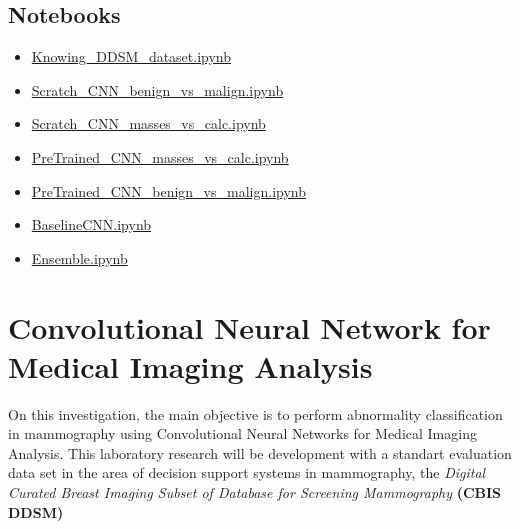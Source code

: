 \documentclass{book}
\begin{document}
        \section{Notebooks}
        \begin{itemize}
            \item \href{https://github.com/MarshaGomez/CNN-Medical-Imaging-Analysis/blob/main/Code/Knowing_DDSM_dataset.ipynb}{Knowing\_DDSM\_dataset.ipynb}
            \item \href{https://github.com/MarshaGomez/CNN-Medical-Imaging-Analysis/blob/main/Code/Scratch_CNN_benign_vs_malign.ipynb}{Scratch\_CNN\_benign\_vs\_malign.ipynb}
            \item \href{https://github.com/MarshaGomez/CNN-Medical-Imaging-Analysis/blob/main/Code/Scratch_CNN_masses_vs_calc.ipynb}{Scratch\_CNN\_masses\_vs\_calc.ipynb}
            \item \href{https://github.com/MarshaGomez/CNN-Medical-Imaging-Analysis/blob/main/Code/PreTrained_CNN_masses_vs_calc.ipynb}{PreTrained\_CNN\_masses\_vs\_calc.ipynb}
            \item \href{https://github.com/MarshaGomez/CNN-Medical-Imaging-Analysis/blob/main/Code/PreTrained_CNN_benign_vs_malign.ipynb}{PreTrained\_CNN\_benign\_vs\_malign.ipynb}
            \item \href{https://github.com/MarshaGomez/CNN-Medical-Imaging-Analysis/blob/main/Code/BaselineCNN.ipynb}{BaselineCNN.ipynb}
            \item \href{https://github.com/MarshaGomez/CNN-Medical-Imaging-Analysis/blob/main/Code/Ensemble.ipynb}{Ensemble.ipynb}
        \end{itemize}


    \chapter{Convolutional Neural Network for Medical Imaging Analysis}  %

    On this investigation, the main objective is to perform abnormality classification in mammography using Convolutional Neural Networks for Medical Imaging Analysis. This laboratory research will be development with a standart evaluation data set in the area of decision support systems in mammography, the \textit{Digital Curated Breast Imaging Subset of Database for Screening Mammography} \textbf{(CBIS DDSM)}
    
\end{document}
